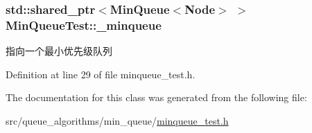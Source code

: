 \subsubsection[{\+\_\+minqueue}]{\setlength{\rightskip}{0pt plus 5cm}std\+::shared\+\_\+ptr$<${\bf Min\+Queue}$<${\bf Node}$>$ $>$ Min\+Queue\+Test\+::\+\_\+minqueue\hspace{0.3cm}{\ttfamily [protected]}}\label{class_min_queue_test_a372d59dab9f706027a6be031a1ab99dc}
指向一个最小优先级队列 

Definition at line 29 of file minqueue\+\_\+test.\+h.



The documentation for this class was generated from the following file\+:\begin{DoxyCompactItemize}
\item 
src/queue\+\_\+algorithms/min\+\_\+queue/\hyperlink{minqueue__test_8h}{minqueue\+\_\+test.\+h}\end{DoxyCompactItemize}
